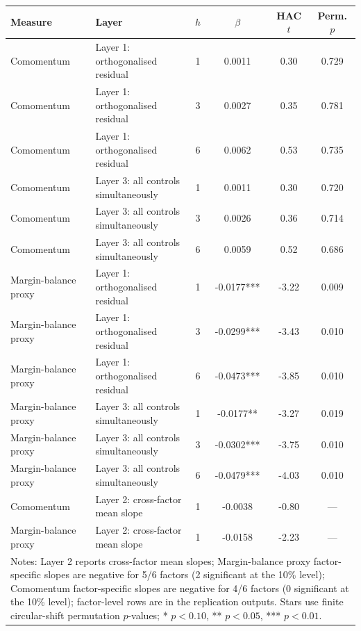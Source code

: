 \begingroup\small\setlength{\tabcolsep}{2.5pt}
\begin{tabular}{llcccc}
\toprule
Measure & Layer & $h$ & $\beta$ & HAC $t$ & Perm. $p$ \\
\midrule
Comomentum & Layer 1: orthogonalised residual & 1 & 0.0011 & 0.30 & 0.729 \\
Comomentum & Layer 1: orthogonalised residual & 3 & 0.0027 & 0.35 & 0.781 \\
Comomentum & Layer 1: orthogonalised residual & 6 & 0.0062 & 0.53 & 0.735 \\
Comomentum & Layer 3: all controls simultaneously & 1 & 0.0011 & 0.30 & 0.720 \\
Comomentum & Layer 3: all controls simultaneously & 3 & 0.0026 & 0.36 & 0.714 \\
Comomentum & Layer 3: all controls simultaneously & 6 & 0.0059 & 0.52 & 0.686 \\
Margin-balance proxy & Layer 1: orthogonalised residual & 1 & -0.0177*** & -3.22 & 0.009 \\
Margin-balance proxy & Layer 1: orthogonalised residual & 3 & -0.0299*** & -3.43 & 0.010 \\
Margin-balance proxy & Layer 1: orthogonalised residual & 6 & -0.0473*** & -3.85 & 0.010 \\
Margin-balance proxy & Layer 3: all controls simultaneously & 1 & -0.0177** & -3.27 & 0.019 \\
Margin-balance proxy & Layer 3: all controls simultaneously & 3 & -0.0302*** & -3.75 & 0.010 \\
Margin-balance proxy & Layer 3: all controls simultaneously & 6 & -0.0479*** & -4.03 & 0.010 \\
Comomentum & Layer 2: cross-factor mean slope & 1 & -0.0038 & -0.80 & — \\
Margin-balance proxy & Layer 2: cross-factor mean slope & 1 & -0.0158 & -2.23 & — \\
\midrule
\multicolumn{6}{l}{\parbox{\dimexpr\textwidth-10pt\relax}{\footnotesize Notes: Layer 2 reports cross-factor mean slopes; Margin-balance proxy factor-specific slopes are negative for 5/6 factors (2 significant at the 10\% level); Comomentum factor-specific slopes are negative for 4/6 factors (0 significant at the 10\% level); factor-level rows are in the replication outputs. Stars use finite circular-shift permutation $p$-values; * $p<0.10$, ** $p<0.05$, *** $p<0.01$.}} \\
\bottomrule
\end{tabular}

\endgroup